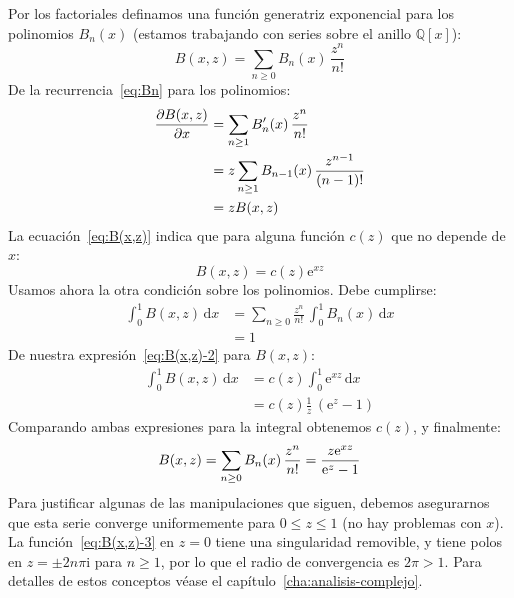   Por los factoriales definamos una función generatriz exponencial
  para los polinomios \(B_n(x)\)
  (estamos trabajando con series sobre el anillo \(\mathbb{Q}[x]\)):
  \begin{equation}
    \label{eq:definicion-B(x,z)}
    B(x, z)
      = \sum_{n \ge 0} B_n(x) \, \frac{z^n}{n!}
  \end{equation}
  De la recurrencia~\eqref{eq:Bn} para los polinomios:
  \begin{align}
    \frac{\partial B(x, z)}{\partial x}
      &= \sum_{n \ge 1} B'_n(x) \, \frac{z^n}{n!} \notag \\
      &= z \sum_{n \ge 1}
	     B_{n - 1}(x) \, \frac{z^{n - 1}}{(n - 1)!} \notag \\
      &= z B(x, z) \label{eq:B(x,z)}
  \end{align}
  La ecuación~\eqref{eq:B(x,z)} indica
  que para alguna función \(c(z)\) que no depende de \(x\):
  \begin{equation}
    \label{eq:B(x,z)-2}
    B(x, z)
      = c(z) \mathrm{e}^{x z}
  \end{equation}
  Usamos ahora la otra condición sobre los polinomios.
  Debe cumplirse:
  \begin{align*}
    \int_0^1 B(x, z) \, \mathrm{d} x
      &= \sum_{n \ge 0}
	   \frac{z^n}{n!} \, \int_0^1 B_n(x) \, \mathrm{d} x \\
      &= 1
  \end{align*}
  De nuestra expresión~\eqref{eq:B(x,z)-2} para \(B(x, z)\):
  \begin{align*}
    \int_0^1 B(x, z) \, \mathrm{d} x
      &= c(z) \int_0^1 \mathrm{e}^{x z} \, \mathrm{d} x \\
      &= c(z) \frac{1}{z} \, \left( \mathrm{e}^z - 1 \right)
  \end{align*}
  Comparando ambas expresiones para la integral obtenemos \(c(z)\),
  y finalmente:
  \begin{equation}
    \index{Bernoulli, polinomios de!generatriz}
    \label{eq:B(x,z)-3}
    B(x, z)
      = \sum_{n \ge 0} B_n(x) \, \frac{z^n}{n!}
      = \frac{z \mathrm{e}^{x z}}{\mathrm{e}^z - 1}
  \end{equation}
  Para justificar algunas de las manipulaciones que siguen,
  debemos asegurarnos
  que esta serie converge uniformemente para \(0 \le z \le 1\)%
  (no hay problemas con \(x\)).
  La función~\eqref{eq:B(x,z)-3} en \(z = 0\)
  tiene una singularidad removible,%
  y tiene polos en \(z = \pm 2 n \pi \mathrm{i}\) para \(n \ge 1\),%
  por lo que el radio de convergencia es \(2 \pi > 1\).%
  Para detalles de estos conceptos
  véase el capítulo~\ref{cha:analisis-complejo}.%

